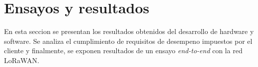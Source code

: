 
\chapter{Ensayos y resultados} %
En esta seccion se presentan los resultados obtenidos del desarrollo de hardware y software. Se analiza el cumplimiento de requisitos de desempeno impuestos por el cliente y finalmente, se exponen resultados de un ensayo \textit{end-to-end} con la red LoRaWAN.\\
\label{Chapter4} %
